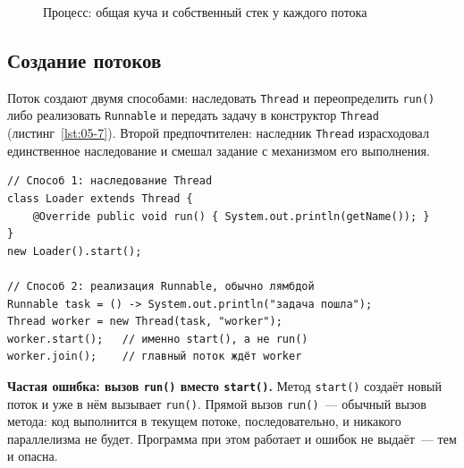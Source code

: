 \begin{figure}[htbp]\centering
{}
\caption{Процесс: общая куча и собственный стек у каждого потока}\label{fig:05-4}
\end{figure}

\subsection{Создание потоков}

Поток создают двумя способами: наследовать \texttt{Thread} и переопределить
\texttt{run()} либо реализовать \texttt{Runnable} и передать задачу в конструктор
\texttt{Thread} (листинг~\ref{lst:05-7}). Второй предпочтителен: наследник
\texttt{Thread} израсходовал единственное наследование и смешал задание с
механизмом его выполнения.

\begin{listing}[H]
\begin{verbatim}
// Способ 1: наследование Thread
class Loader extends Thread {
    @Override public void run() { System.out.println(getName()); }
}
new Loader().start();

// Способ 2: реализация Runnable, обычно лямбдой
Runnable task = () -> System.out.println("задача пошла");
Thread worker = new Thread(task, "worker");
worker.start();   // именно start(), а не run()
worker.join();    // главный поток ждёт worker
\end{verbatim}
\caption{Два способа создать поток выполнения}
\label{lst:05-7}
\end{listing}

\begin{oshibka}
\textbf{Частая ошибка: вызов \texttt{run()} вместо \texttt{start()}.} Метод
\texttt{start()} создаёт новый поток и уже в нём вызывает \texttt{run()}. Прямой
вызов \texttt{run()}~--- обычный вызов метода: код выполнится в текущем потоке,
последовательно, и никакого параллелизма не будет. Программа при этом работает и
ошибок не выдаёт~--- тем и опасна.
\end{oshibka}

